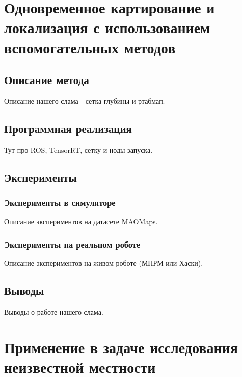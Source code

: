 \documentclass{mipt-thesis-ms}
\begin{document}
	\chapter{Одновременное картирование и локализация с использованием вспомогательных методов}
	
	\section{Описание метода}
	
	Описание нашего слама - сетка глубины и ртабмап.
	
	\section{Программная реализация}
	
	Тут про ROS, TensorRT, сетку и ноды запуска.
	
	\section{Эксперименты}
	
	\subsection{Эксперименты в симуляторе}
	\label{section_experiments}
	
	Описание экспериментов на датасете MAOMaps.
	
	\subsection{Эксперименты на реальном роботе}
	
	Описание экспериментов на живом роботе (МПРМ или Хаски).
	
	\section{Выводы}
	
	Выводы о работе нашего слама.
	
	
	\chapter{Применение в задаче исследования неизвестной местности}
	
\end{document}
